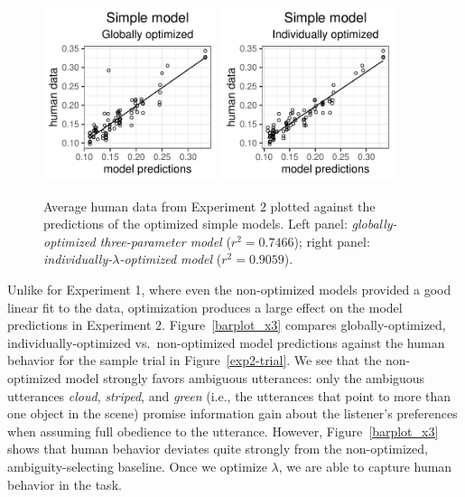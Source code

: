 \documentclass[11pt,a4paper]{article}
\newcommand{\gcs}[1]{\textcolor{blue}{[gcs: #1]}}
\begin{document}
\begin{figure}[ht]
	\centering
	\includegraphics[width=2in]{images/x3_m24.pdf}
	\includegraphics[width=2in]{images/x3_m11.pdf}
	\caption{Average human data from Experiment 2 plotted against the predictions of the optimized simple models.
		Left panel: \emph{globally-optimized three-parameter model} ($r^{2}=0.7466$);
		right panel: \emph{individually-$\lambda$-optimized model} ($r^{2}=0.9059$). }
	\label{global-individual-x3}
\end{figure}


Unlike for Experiment 1, where even the non-optimized models provided a good linear fit to the data, optimization produces a large effect on the model predictions in Experiment 2.
Figure~\ref{barplot_x3} compares globally-optimized, individually-optimized vs.~non-optimized model predictions against the human behavior for the sample trial in Figure~\ref{exp2-trial}. 
We see that the non-optimized model strongly favors ambiguous utterances:
only the ambiguous utterances \textit{cloud}, \textit{striped}, and \textit{green}
(i.e., the utterances that point to more than one object in the scene)
promise information gain about the listener's preferences when assuming full obedience to the utterance.
However, Figure~\ref{barplot_x3} shows that human behavior deviates quite strongly from the non-optimized, ambiguity-selecting baseline.
Once we optimize $\lambda$, we are able to capture human behavior in the task.
\end{document}
